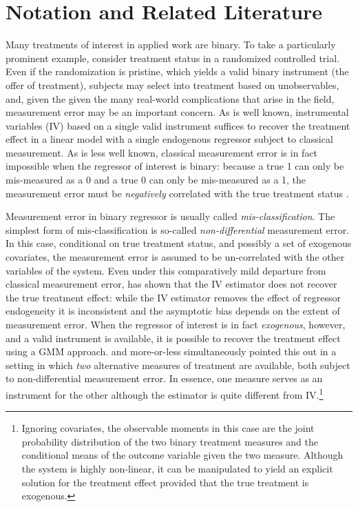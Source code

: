 \section{Notation and Related Literature}

Many treatments of interest in applied work are binary.
To take a particularly prominent example, consider treatment status in a randomized controlled trial.
Even if the randomization is pristine, which yields a valid binary instrument (the offer of treatment), subjects may select into treatment based on unobservables, and, given the given the many real-world complications that arise in the field, measurement error may be an important concern.
As is well known, instrumental variables (IV) based on a single valid instrument suffices to recover the treatment effect in a linear model with a single endogenous regressor subject to classical measurement.
As is less well known, classical measurement error is in fact impossible when the regressor of interest is binary: because a true 1 can only be mis-measured as a 0 and a true 0 can only be mis-measured as a 1, the measurement error must be \emph{negatively} correlated with the true treatment status \citep{Aigner,Bollinger}. 

Measurement error in binary regressor is usually called \emph{mis-classification}.
The simplest form of mis-classification is so-called \emph{non-differential} measurement error.
In this case, conditional on true treatment status, and possibly a set of exogenous covariates, the measurement error is assumed to be un-correlated with the other variables of the system.
Even under this comparatively mild departure from classical measurement error, \cite{Bollinger} has shown that the IV estimator does not recover the true treatment effect: while the IV estimator removes the effect of regressor endogeneity it is inconsistent and the asymptotic bias depends on the extent of measurement error.
When the regressor of interest is in fact \emph{exogenous}, however, and a valid instrument is available, it is possible to recover the treatment effect using a GMM approach.
\cite{BBS} and \cite{KRS} more-or-less simultaneously pointed this out in a setting in which \emph{two} alternative measures of treatment are available, both subject to non-differential measurement error.
In essence, one measure serves as an instrument for the other although the estimator is quite different from IV.\footnote{Ignoring covariates, the observable moments in this case are the joint probability distribution of the two binary treatment measures and the conditional means of the outcome variable given the two measure. Although the system is highly non-linear, it can be manipulated to yield an explicit solution for the treatment effect provided that the true treatment is exogenous.}






